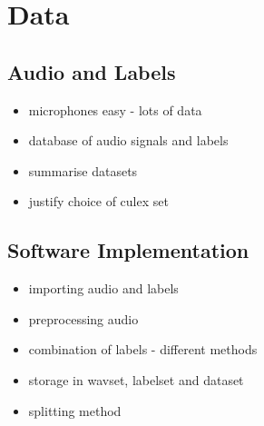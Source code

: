 \section{Data}
\label{sec:pl-data}

    \subsection{Audio and Labels}
    \label{subsec:pl-data-audiolbls}
        \begin{itemize}
            \item{microphones easy - lots of data}
            \item{database of audio signals and labels}
            \item{summarise datasets}
            \item{justify choice of culex set}
        \end{itemize}
    
    \subsection{Software Implementation}
    \label{subsec:pl-data-software}
        \begin{itemize}
            \item{importing audio and labels}
            \item{preprocessing audio}
            \item{combination of labels - different methods}
            \item{storage in wavset, labelset and dataset}
            \item{splitting method}
        \end{itemize}